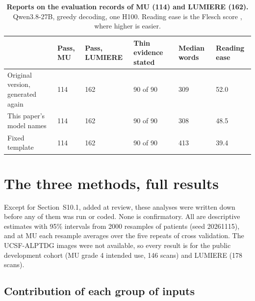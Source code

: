 \documentclass[11pt,a4paper]{article}
\begin{document}
\begin{table}[!htbp]
\renewcommand{\thetable}{S9}\renewcommand{\theHtable}{S9}
\centering
\caption{\textbf{Reports on the evaluation records of MU (114) and LUMIERE (162).} Qwen3.8-27B, greedy decoding, one H100.
Reading ease is the Flesch score \citep{flesch1948}, where higher is easier.}
\label{tab:S25b}
\footnotesize
\begin{tabularx}{\linewidth}{@{}LR{1.6cm}R{1.6cm}R{1.6cm}R{1.4cm}R{1.4cm}@{}}
\toprule
 & Pass, MU & Pass, LUMIERE & Thin evidence stated & Median words & Reading ease \\
\midrule
Original version, generated again & 114 & 162 & 90 of 90 & 309 & 52.0 \\
This paper's model names & 114 & 162 & 90 of 90 & 308 & 48.5 \\
Fixed template & 114 & 162 & 90 of 90 & 413 & 39.4 \\
\bottomrule
\end{tabularx}
\end{table}

\FloatBarrier
\section{The three methods, full results}\label{sec:S26}

Except for Section~S10.1, added at review, these analyses were written down before any of them was run or coded. None is confirmatory. All are
descriptive estimates with 95\% intervals from 2000 resamples of patients (seed 20261115), and at MU each resample
averages over the five repeats of cross validation. The UCSF-ALPTDG images were not available, so every result is for
the public development cohort (MU grade 4 intended use, 146 scans) and LUMIERE (178 scans).

\subsection{Contribution of each group of inputs}\label{sec:S26.1}
\end{document}
